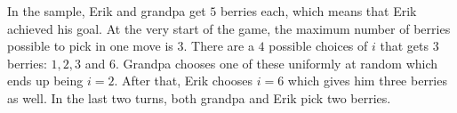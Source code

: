 
In the sample, Erik and grandpa get $5$ berries each, which means that Erik achieved his goal. At the very 
start of the game, the maximum number of berries possible to pick in one move is $3$. There are a $4$ possible 
choices of $i$ that gets $3$ berries: $1,2,3$ and $6$. Grandpa chooses one of these uniformly at random which 
ends up being $i = 2$. After that, Erik chooses $i = 6$ which gives him three berries as
well. In the last two turns, both grandpa and Erik pick two berries.
